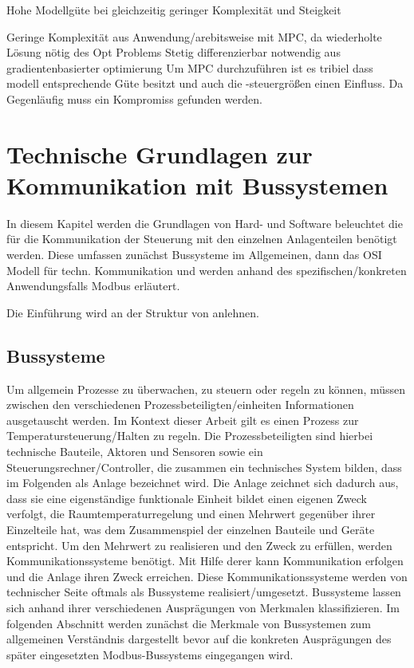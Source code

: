 Hohe Modellgüte bei gleichzeitig geringer Komplexität und Steigkeit


Geringe Komplexität aus Anwendung/arebitsweise mit MPC, da wiederholte Lösung nötig des Opt Problems
Stetig differenzierbar notwendig aus gradientenbasierter optimierung
Um MPC durchzuführen ist es tribiel dass modell entsprechende Güte besitzt und auch die -steuergrößen einen Einfluss.
Da Gegenläufig muss ein Kompromiss gefunden werden.


\section{Technische Grundlagen zur Kommunikation mit Bussystemen}
\label{sec:grundlagenbus}
In diesem Kapitel werden die Grundlagen von Hard- und Software beleuchtet die für die Kommunikation der Steuerung mit den einzelnen Anlagenteilen benötigt werden.
Diese umfassen zunächst Bussysteme im Allgemeinen, dann das OSI Modell für techn. Kommunikation und werden anhand des spezifischen/konkreten Anwendungsfalls Modbus erläutert.

Die Einführung wird an der Struktur von \cite{schn06} anlehnen.

\subsection{Bussysteme} 
Um allgemein Prozesse zu überwachen, zu steuern oder regeln zu können, müssen zwischen den verschiedenen Prozessbeteiligten/einheiten Informationen ausgetauscht werden. Im Kontext dieser Arbeit gilt es einen Prozess zur Temperatursteuerung/Halten zu regeln. Die Prozessbeteiligten sind hierbei technische Bauteile, Aktoren und Sensoren sowie ein Steuerungsrechner/Controller, die zusammen ein technisches System bilden, dass im Folgenden als Anlage bezeichnet wird. Die Anlage zeichnet sich dadurch aus, dass sie eine eigenständige funktionale Einheit bildet einen eigenen Zweck verfolgt, die Raumtemperaturregelung und einen Mehrwert gegenüber ihrer Einzelteile hat, was dem Zusammenspiel der einzelnen Bauteile und Geräte entspricht. 
Um den Mehrwert zu realisieren und den Zweck zu erfüllen, werden Kommunikationssysteme benötigt. Mit Hilfe derer kann Kommunikation erfolgen und die Anlage ihren Zweck erreichen.
Diese Kommunikationssysteme werden von technischer Seite oftmals als Bussysteme realisiert/umgesetzt.
Bussysteme lassen sich anhand ihrer verschiedenen Ausprägungen von Merkmalen klassifizieren. Im folgenden Abschnitt werden zunächst die Merkmale von Bussystemen zum allgemeinen Verständnis dargestellt bevor auf die konkreten Ausprägungen des später eingesetzten Modbus-Bussystems eingegangen wird.


